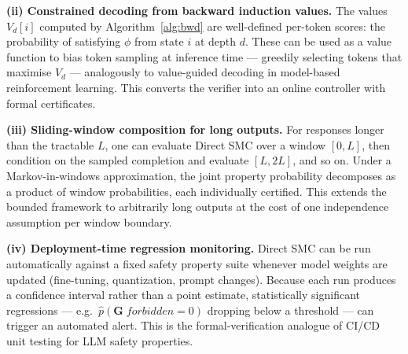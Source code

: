 \documentclass{article}
\begin{document}
\textbf{(ii) Constrained decoding from backward induction values.}
The values $V_d[i]$ computed by Algorithm~\ref{alg:bwd} are well-defined
per-token scores: the probability of satisfying $\phi$ from state $i$ at
depth $d$.
These can be used as a value function to bias token sampling at inference
time — greedily selecting tokens that maximise $V_d$ — analogously to
value-guided decoding in model-based reinforcement learning.
This converts the verifier into an online controller with formal certificates.

\textbf{(iii) Sliding-window composition for long outputs.}
For responses longer than the tractable $L$, one can evaluate Direct SMC
over a window $[0, L]$, then condition on the sampled completion and evaluate
$[L, 2L]$, and so on.
Under a Markov-in-windows approximation, the joint property probability
decomposes as a product of window probabilities, each individually certified.
This extends the bounded framework to arbitrarily long outputs at the cost of
one independence assumption per window boundary.

\textbf{(iv) Deployment-time regression monitoring.}
Direct SMC can be run automatically against a fixed safety property suite
whenever model weights are updated (fine-tuning, quantization, prompt
changes).
Because each run produces a confidence interval rather than a point estimate,
statistically significant regressions — e.g.\ $\hat{p}(\mathbf{G}\;
\textit{forbidden}{=}0)$ dropping below a threshold — can trigger an
automated alert.
This is the formal-verification analogue of CI/CD unit testing for LLM
safety properties.



\end{document}
